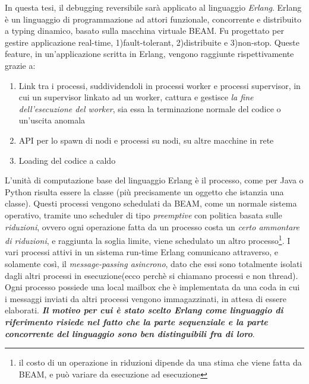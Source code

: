 \documentclass[Tesi.tex]{subfiles}
\begin{document}
In questa tesi, il debugging reversibile sarà applicato al linguaggio \textit{Erlang}\cite{erlangDoc}.
Erlang è un linguaggio di programmazione ad attori funzionale, concorrente e distribuito a typing dinamico, basato sulla macchina virtuale BEAM.
Fu progettato per gestire applicazione real-time, 1)fault-tolerant, 2)distribuite e 3)non-stop.
Queste feature, in un'applicazione scritta in Erlang, vengono raggiunte rispettivamente grazie a:
\begin{enumerate}
	\item{Link tra i processi, suddividendoli in processi worker e processi supervisor, in cui un supervisor linkato ad un worker, cattura e gestisce \textit{la fine dell'esecuzione del worker}, sia essa la terminazione normale del codice o un'uscita anomala}
	\item{API per lo spawn di nodi e processi su nodi, su altre macchine in rete}
	\item{Loading del codice a caldo}
\end{enumerate}
L'unità di computazione base del linguaggio Erlang è il processo, come per Java o Python risulta essere 
la classe (più precisamente un oggetto che istanzia una classe).
Questi processi vengono schedulati da BEAM, come un normale sistema operativo, tramite uno scheduler di tipo \textit{preemptive} con politica basata sulle \textit{riduzioni}, ovvero ogni operazione fatta da un processo costa un \textit{certo ammontare di riduzioni}, e raggiunta la soglia limite, viene schedulato un altro processo\footnote{il costo di un operazione in riduzioni dipende da una stima che viene fatta da BEAM, e può variare da esecuzione ad esecuzione}.
I vari processi attivi in un sistema run-time Erlang comunicano attraverso, e solamente così, il \textit{message-passing asincrono}, dato che essi sono totalmente isolati dagli altri processi in esecuzione(ecco perchè si chiamano processi e non thread).
Ogni processo possiede una local mailbox che è implementata da una coda in cui i messaggi inviati da altri processi vengono immagazzinati, in attesa di essere elaborati.
\textbf{\textit{Il motivo per cui è stato scelto Erlang come linguaggio di riferimento risiede nel fatto che la parte sequenziale e la parte concorrente del linguaggio sono ben distinguibili fra di loro}}.
\end{document}
